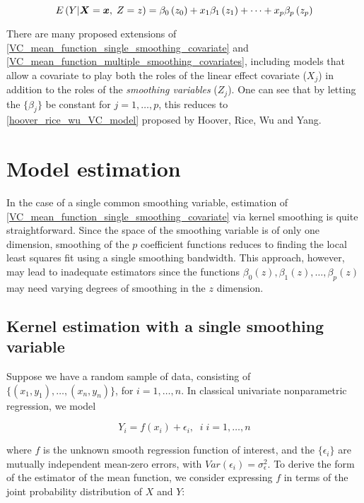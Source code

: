 \documentclass[12pt]{article}
\newcommand{\bfx}{\mbox{\boldmath $x$}}
\newcommand{\bfX}{\mbox{\boldmath $X$}}
\begin{document}
\begin{equation}
E\left(Y \vert \bfX=\bfx,\;Z = z \right) = \beta_0\left(z_0\right) + x_1\beta_1\left(z_1\right) + \dots  + x_p\beta_p\left(z_p\right) \label{VC_mean_function_multiple_smoothing_covariates}
\end{equation}

There are many proposed extensions of \eqref{VC_mean_function_single_smoothing_covariate} and \eqref{VC_mean_function_multiple_smoothing_covariates}, including models that allow a covariate to play both the roles of the linear effect covariate ($X_j$) in addition to the roles of the \textit{smoothing variables} ($Z_j$). One can see that by letting the $\lbrace  \beta_j \rbrace$ be constant for $j=1, \dots, p$, this reduces to \eqref{hoover_rice_wu_VC_model} proposed by Hoover, Rice, Wu and Yang. 

\section{Model estimation}

In the case of a single common smoothing variable, estimation of \eqref{VC_mean_function_single_smoothing_covariate} via kernel smoothing is quite straightforward. Since the space of the smoothing variable is of only one dimension, smoothing of the $p$ coefficient functions reduces to finding the local least squares fit using a single smoothing bandwidth. This approach, however, may lead to inadequate estimators since the functions $\beta_0\left(z\right), \beta_1\left(z\right), \dots, \beta_p\left(z\right)$ may need varying degrees of smoothing in the $z$ dimension.

\subsection{Kernel estimation with a single smoothing variable}

Suppose we have a random sample of data, consisting of $\lbrace \left(x_1, y_1\right),\dots, \left(x_n, y_n\right)\rbrace$, for $i=1,\dots,n$. In classical univariate nonparametric regression, we model 

\begin{equation}
Y_i = f\left(x_i\right) + \epsilon_i,\;\;i\;i=1,\dots, n \label{classical_NP_regression_model}
\end{equation} 

where $f$ is the unknown smooth regression function of interest, and the $\lbrace \epsilon_i \rbrace$ are mutually independent mean-zero errors, with $Var\left(\epsilon_i\right)=\sigma_\epsilon^2$. To derive the form of the estimator of the mean function, we consider expressing $f$ in terms of the joint probability distribution of $X$ and $Y$:
\end{document}
